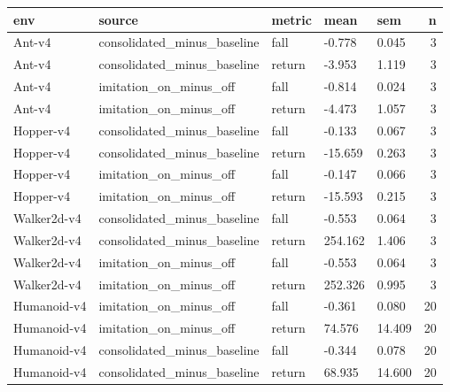 \begin{tabular}{lllllr}
\toprule
env & source & metric & mean & sem & n \\
\midrule
Ant-v4 & consolidated\_minus\_baseline & fall & -0.778 & 0.045 & 3 \\
Ant-v4 & consolidated\_minus\_baseline & return & -3.953 & 1.119 & 3 \\
Ant-v4 & imitation\_on\_minus\_off & fall & -0.814 & 0.024 & 3 \\
Ant-v4 & imitation\_on\_minus\_off & return & -4.473 & 1.057 & 3 \\
Hopper-v4 & consolidated\_minus\_baseline & fall & -0.133 & 0.067 & 3 \\
Hopper-v4 & consolidated\_minus\_baseline & return & -15.659 & 0.263 & 3 \\
Hopper-v4 & imitation\_on\_minus\_off & fall & -0.147 & 0.066 & 3 \\
Hopper-v4 & imitation\_on\_minus\_off & return & -15.593 & 0.215 & 3 \\
Walker2d-v4 & consolidated\_minus\_baseline & fall & -0.553 & 0.064 & 3 \\
Walker2d-v4 & consolidated\_minus\_baseline & return & 254.162 & 1.406 & 3 \\
Walker2d-v4 & imitation\_on\_minus\_off & fall & -0.553 & 0.064 & 3 \\
Walker2d-v4 & imitation\_on\_minus\_off & return & 252.326 & 0.995 & 3 \\
Humanoid-v4 & imitation\_on\_minus\_off & fall & -0.361 & 0.080 & 20 \\
Humanoid-v4 & imitation\_on\_minus\_off & return & 74.576 & 14.409 & 20 \\
Humanoid-v4 & consolidated\_minus\_baseline & fall & -0.344 & 0.078 & 20 \\
Humanoid-v4 & consolidated\_minus\_baseline & return & 68.935 & 14.600 & 20 \\
\bottomrule
\end{tabular}
